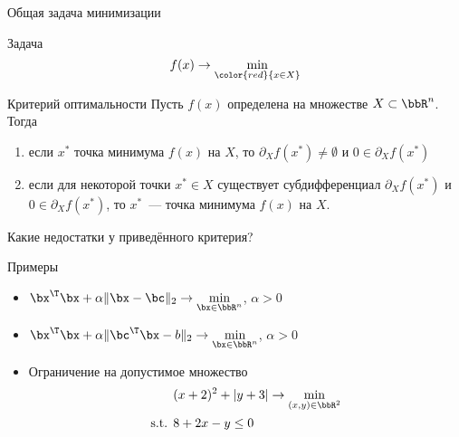 \documentclass[12pt,russian]{beamer}
\begin{document}
\begin{frame}{Общая задача минимизации}

\begin{block}{Задача}
\[
f(x) \rightarrow \min\limits_{{\color{red}{x \in X}}}
\]
\end{block}

\begin{block}{Критерий оптимальности}
Пусть $f(x)$ определена на множестве $X \subset \bbR^n$.
Тогда 
\begin{enumerate}
\item если $x^*$ точка минимума $f(x)$ на $X$, то $\partial_X f(x^*) \neq \emptyset$ и $0 \in \partial_X f(x^*)$
\item если для некоторой точки $x^* \in X$ существует субдифференциал $\partial_X f(x^*)$ и $0 \in \partial_X f(x^*)$, то $x^*$~--- точка минимума $f(x)$ на $X$.
\end{enumerate}
\end{block}
Какие недостатки у приведённого критерия?

\end{frame}

\begin{frame}{Примеры}
\begin{itemize}
\item $\bx^{\T}\bx + \alpha \| \bx - 
\bc \|_2 \rightarrow \min\limits_{\bx \in \bbR^n}$, $\alpha > 0$
\item $\bx^{\T}\bx + \alpha \| \bc^{\T}\bx - 
b \|_2 \rightarrow \min\limits_{\bx \in \bbR^n}$, $\alpha > 0$
\item Ограничение на допустимое множество
\begin{equation*}
\begin{split}
\vspace{-4mm}
&(x + 2)^2 + |y + 3| \rightarrow \min\limits_{(x, y) \in \bbR^2}\\
\text{s.t. }& 8 + 2x - y \leq 0
\end{split}
\end{equation*}
\end{itemize}
\end{frame}
\end{document}
